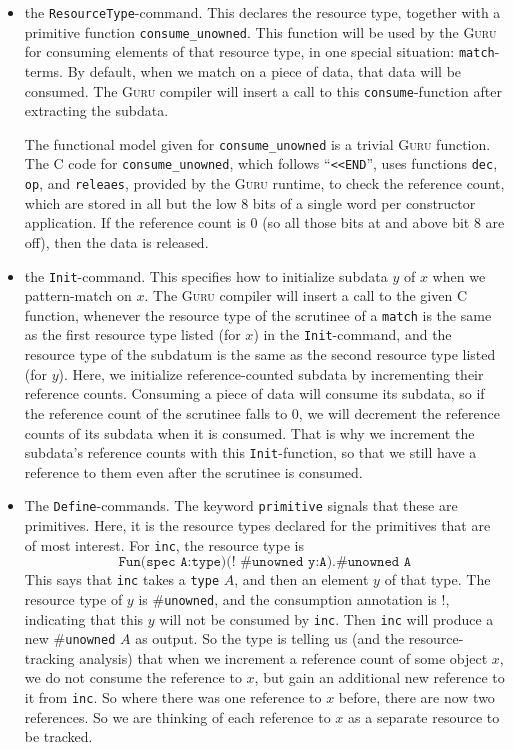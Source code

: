 \documentclass[9pt,natbib]{sigplanconf}
\begin{document}
\begin{itemize}
\item the \texttt{ResourceType}-command.  This declares the resource
  type, together with a primitive function \texttt{consume\_unowned}.
  This function will be used by the \textsc{Guru} for consuming
  elements of that resource type, in one special situation:
  \texttt{match}-terms.  By default, when we match on a piece of data,
  that data will be consumed.  The \textsc{Guru} compiler will insert
  a call to this \texttt{consume}-function after extracting the
  subdata.

  The functional model given for \texttt{consume\_unowned} is a
  trivial \textsc{Guru} function.  The C code for
  \texttt{consume\_unowned}, which follows ``\texttt{<<END}'', uses
  functions \texttt{dec}, \texttt{op}, and \texttt{releaes}, provided
  by the \textsc{Guru} runtime, to check the reference count, which
  are stored in all but the low 8 bits of a single word per
  constructor application.  If the reference count is 0 (so all those
  bits at and above bit 8 are off), then the data is released.

\item the \texttt{Init}-command.  This specifies how to initialize
  subdata $y$ of $x$ when we pattern-match on $x$.  The \textsc{Guru}
  compiler will insert a call to the given C function, whenever the
  resource type of the scrutinee of a \texttt{match} is the same as
  the first resource type listed (for $x$) in the
  \texttt{Init}-command, and the resource type of the subdatum is the
  same as the second resource type listed (for $y$).  Here, we
  initialize reference-counted subdata by incrementing their reference
  counts.  Consuming a piece of data will consume its subdata, so if
  the reference count of the scrutinee falls to $0$, we will decrement
  the reference counts of its subdata when it is consumed.  That is
  why we increment the subdata's reference counts with this
  \texttt{Init}-function, so that we still have a reference to them
  even after the scrutinee is consumed.
  
\item The \texttt{Define}-commands.  The keyword \texttt{primitive}
signals that these are primitives.  Here, it is the resource types declared for
the primitives that are of most interest.  For \texttt{inc}, the resource type
is
\[
\texttt{Fun(spec A:type)(! \#unowned y:A).\#unowned A}
\]
\noindent This says that \texttt{inc} takes a \texttt{type} $A$, and
then an element $y$ of that type.  The resource type of $y$ is
\#\texttt{unowned}, and the consumption annotation is $!$, indicating
that this $y$ will not be consumed by \texttt{inc}.  Then \texttt{inc}
will produce a new \#\texttt{unowned} $A$ as output.  So the type is
telling us (and the resource-tracking analysis) that when we increment
a reference count of some object $x$, we do not consume the reference
to $x$, but gain an additional new reference to it from \texttt{inc}.
So where there was one reference to $x$ before, there are now two
references.  So we are thinking of each reference to $x$ as a separate
resource to be tracked.


\end{itemize}
\end{document}
